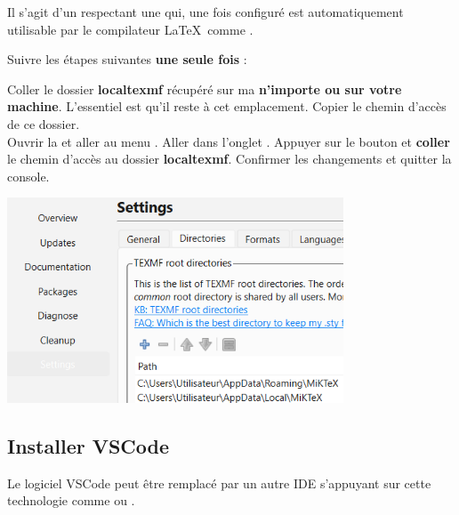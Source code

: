 Il s'agit d'un  respectant une  qui, une fois configuré est automatiquement utilisable par le compilateur \LaTeX\ comme .
\begin{MultiColonnes}{2}
    \tcbitem Suivre les étapes suivantes \textbf{une seule fois} :
    \begin{tcbenumerate}
        \tcbitem Coller le dossier \textbf{localtexmf} récupéré sur ma  \textbf{n'importe ou sur votre machine}. L'essentiel est qu'il reste à cet emplacement. 
        \tcbitem Copier le chemin d'accès de ce dossier. \\
        \tcbitem Ouvrir la  et aller au menu .
        \tcbitem Aller dans l'onglet .
        \tcbitem Appuyer sur le bouton \bouton{+} et \textbf{coller} le chemin d'accès au dossier \textbf{localtexmf}.
        \tcbitem Confirmer les changements et quitter la console. 
    \end{tcbenumerate}
    \tcbitem[valign=center] 
    \begin{center}
        \includegraphics[width=0.75\textwidth]{images/miktex/set_localtexmf_path.png}
    \end{center}
\end{MultiColonnes}

\subsection{Installer VSCode}

Le logiciel VSCode peut être remplacé par un autre IDE s'appuyant sur cette technologie comme  ou .


